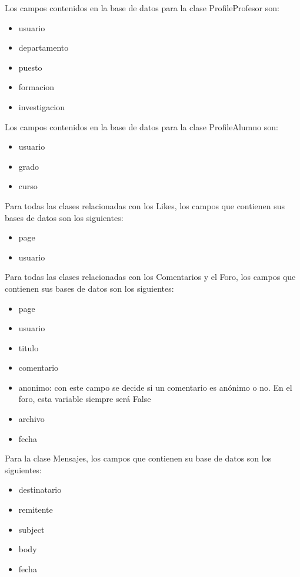 \begin{itemize}
Los campos contenidos en la base de datos para la clase ProfileProfesor son:
	\begin{itemize}
		\item usuario
		\item departamento
		\item puesto
		\item formacion
		\item investigacion
	\end{itemize}
	
Los campos contenidos en la base de datos para la clase ProfileAlumno son:
	\begin{itemize}
		\item usuario
		\item grado
		\item curso
	\end{itemize} 

Para todas las clases relacionadas con los Likes, los campos que contienen sus bases de datos son los siguientes:
	\begin{itemize}
		\item page
		\item usuario
	\end{itemize}

Para todas las clases relacionadas con los Comentarios y el Foro, los campos que contienen sus bases de datos son los siguientes:
	\begin{itemize}
		\item page
		\item usuario
		\item titulo
		\item comentario
		\item anonimo: con este campo se decide si un comentario es anónimo o no. En el foro, esta variable siempre será False
		\item archivo
		\item fecha
	\end{itemize}

Para la clase Mensajes, los campos que contienen su base de datos son los siguientes:
\begin{itemize}
		\item destinatario
		\item remitente
		\item subject
		\item body
		\item fecha
	\end{itemize}    
    

\end{itemize}

